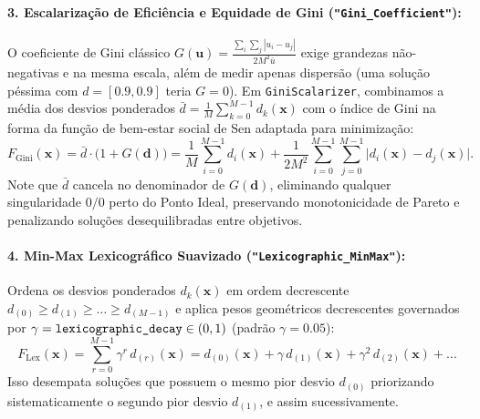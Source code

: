 \documentclass[11pt,a4paper]{article}
\begin{document}
\paragraph{3. Escalarização de Eficiência e Equidade de Gini (\texttt{"Gini\_Coefficient"}):}
O coeficiente de Gini clássico $G(\mathbf{u}) = \frac{\sum_i \sum_j |u_i - u_j|}{2 M^2 \bar{u}}$ exige grandezas não-negativas e na mesma escala, além de medir apenas dispersão (uma solução péssima com $d = [0.9, 0.9]$ teria $G=0$). Em \texttt{GiniScalarizer}, combinamos a média dos desvios ponderados $\bar{d} = \frac{1}{M}\sum_{k=0}^{M-1} d_k(\mathbf{x})$ com o índice de Gini na forma da função de bem-estar social de Sen adaptada para minimização:
\begin{equation}
  F_{\text{Gini}}(\mathbf{x}) = \bar{d}\cdot\big(1 + G(\mathbf{d})\big)
  = \frac{1}{M}\sum_{i=0}^{M-1} d_i(\mathbf{x})
  + \frac{1}{2 M^2} \sum_{i=0}^{M-1}\sum_{j=0}^{M-1} \big|d_i(\mathbf{x}) - d_j(\mathbf{x})\big|.
  \label{eq:gini}
\end{equation}
Note que $\bar{d}$ cancela no denominador de $G(\mathbf{d})$, eliminando qualquer singularidade $0/0$ perto do Ponto Ideal, preservando monotonicidade de Pareto e penalizando soluções desequilibradas entre objetivos.

\paragraph{4. Min-Max Lexicográfico Suavizado (\texttt{"Lexicographic\_MinMax"}):}
Ordena os desvios ponderados $d_k(\mathbf{x})$ em ordem decrescente $d_{(0)} \ge d_{(1)} \ge \dots \ge d_{(M-1)}$ e aplica pesos geométricos decrescentes governados por $\gamma = \text{\texttt{lexicographic\_decay}} \in (0,1)$ (padrão $\gamma = 0.05$):
\begin{equation}
  F_{\text{Lex}}(\mathbf{x}) = \sum_{r=0}^{M-1} \gamma^{r} \, d_{(r)}(\mathbf{x})
  = d_{(0)}(\mathbf{x}) + \gamma\, d_{(1)}(\mathbf{x}) + \gamma^2\, d_{(2)}(\mathbf{x}) + \dots
  \label{eq:lex}
\end{equation}
Isso desempata soluções que possuem o mesmo pior desvio $d_{(0)}$ priorizando sistematicamente o segundo pior desvio $d_{(1)}$, e assim sucessivamente.
\end{document}
